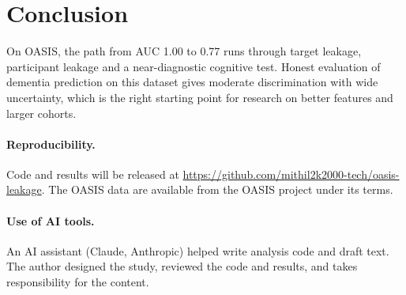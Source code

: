 \documentclass[11pt]{article}
\begin{document}
\section{Conclusion}
On OASIS, the path from AUC 1.00 to 0.77 runs through target leakage, participant leakage and a near-diagnostic cognitive test. Honest
evaluation of dementia prediction on this dataset gives moderate discrimination with wide uncertainty, which is the right starting point
for research on better features and larger cohorts.

\paragraph{Reproducibility.} Code and results will be released at
\newline\url{https://github.com/mithil2k2000-tech/oasis-leakage}. The OASIS data are available from the OASIS project under its terms.

\paragraph{Use of AI tools.} An AI assistant (Claude, Anthropic) helped write analysis code and draft text. The author designed the
study, reviewed the code and results, and takes responsibility for the content.



\end{document}
